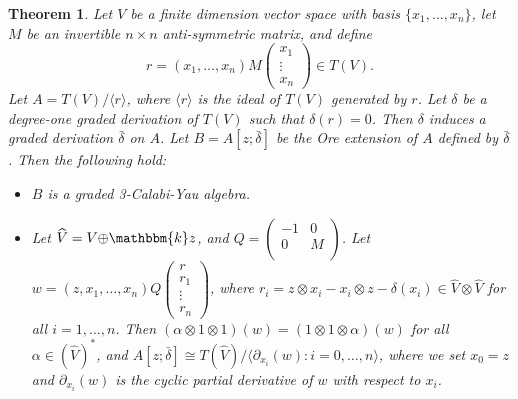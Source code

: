 \documentclass[a4paper]{amsart}
\newtheorem{thm}{Theorem}[section]
\begin{document}
\begin{thm}\label{thm} Let $V$ be a finite dimension vector space with basis $\{x_1,\dots,x_n\}$, let $M$ be an invertible $n\times n$ anti-symmetric matrix, and define
 $$r=(x_1,\dots,x_n)M\left(
                                                                          \begin{array}{c}
                                                                            x_1 \\                                                                          \vdots \\
x_n                                                                         \end{array}
                                                                        \right)
\in T(V).$$ Let $A=T(V)/\langle r\rangle$, where $\langle r\rangle$ is the ideal of $T(V)$ generated by $r$. Let $\delta$ be a degree-one graded derivation of $T(V)$ such that $\delta(r)=0$. Then $\delta$ induces a graded derivation $\bar{\delta}$ on $A$. Let $B=A[z;\bar{\delta}]$ be the Ore extension of $A$ defined by $\bar{\delta}$. Then the following hold:
\begin{itemize}
\item[(i)] $B$ is a graded 3-Calabi-Yau algebra.

\item[(ii)] Let $\widehat{V}=V{\oplus}{\mathbbm{k}} z$, and $Q=\left(
                                   \begin{array}{ccc}
                                     -1 & 0  \\
                                     0 & M \\
                                   \end{array}
                                 \right)$. Let        $w=(z,x_1,\dots,x_n)Q\left(
                                                                          \begin{array}{c}
                                                                            r \\
                                                                            r_1 \\
                                                                            \vdots \\
                                                                            r_n
                                                                          \end{array}
                                                                        \right)$, where $r_i=z{\otimes} x_i-x_i{\otimes} z-\delta(x_i)\in \widehat{V}{\otimes} \widehat{V}$ for all $i=1,\dots,n$. Then
$(\alpha{\otimes}1{\otimes}1)(w)=(1{\otimes}1{\otimes}\alpha)(w)$ for all $\alpha\in (\widehat{V})^*$, and $A[z;\bar{\delta}]\cong T(\widehat{V})/\langle \partial_{x_i}(w):i=0,\dots,n\rangle$, where we set $x_0=z$ and $\partial_{x_i}(w)$ is the cyclic partial derivative of $w$ with respect to $x_i$.


\end{itemize}
\end{thm}
\end{document}
